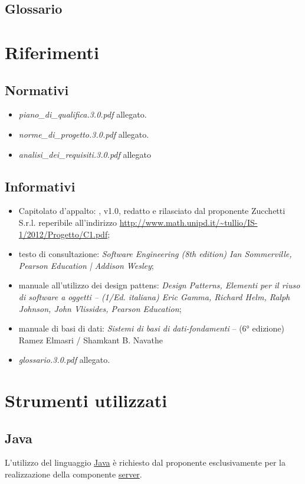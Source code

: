 \subsection{Glossario}
\glossaryIntro

\clearpage
\section{Riferimenti}

\subsection{Normativi}
\begin{itemize}
\item[] \textit{piano\_di\_qualifica.3.0.pdf} allegato.
\item[] \textit{norme\_di\_progetto.3.0.pdf} allegato.
\item[] \textit{analisi\_dei\_requisiti.3.0.pdf} allegato
\end{itemize}

\subsection{Informativi}
\begin{itemize}
\item[] Capitolato d'appalto: \caName{}, v1.0, redatto e rilasciato dal proponente Zucchetti S.r.l. reperibile all'indirizzo \url{http://www.math.unipd.it/~tullio/IS-1/2012/Progetto/C1.pdf};
\item[] testo di consultazione: \textit{Software Engineering (8th edition) Ian Sommerville, Pearson Education | Addison Wesley};
\item[] manuale all'utilizzo dei design pattens: \textit{Design Patterns, Elementi per il riuso di software a oggetti -- (1/Ed. italiana) Eric Gamma, Richard Helm, Ralph Johnson, John Vlissides, Pearson Education};
\item[] manuale di basi di dati: \textit{Sistemi di basi di dati-fondamenti} -- (6° edizione) Ramez Elmasri / Shamkant B. Navathe
\item[] \textit{glossario.3.0.pdf} allegato.
\end{itemize}
\clearpage

\section{Strumenti utilizzati}

\subsection{Java}
L'utilizzo del linguaggio \underline{Java} è richiesto dal proponente esclusivamente per la realizzazione della componente \underline{server}.

